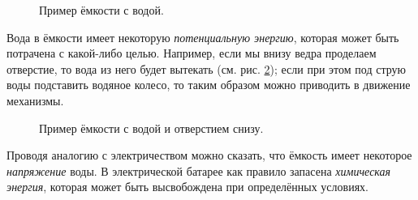\documentclass[a4paper,twoside]{book}
\begin{document}
\begin{figure}[ht]
  \centering
  \caption{Пример ёмкости с водой.}
  \label{fig:electronics-current-0}
\end{figure}

Вода в ёмкости имеет некоторую \emph{потенциальную энергию}, которая может быть
потрачена с какой-либо целью.  Например, если мы внизу ведра проделаем
отверстие, то вода из него будет вытекать
(см. рис. \ref{fig:electronics-current-1}); если при этом под струю воды
подставить водяное колесо, то таким образом можно приводить в движение
механизмы.

\begin{figure}[ht]
  \centering
  \caption{Пример ёмкости с водой и отверстием снизу.}
  \label{fig:electronics-current-1}
\end{figure}

Проводя аналогию с электричеством можно сказать, что ёмкость имеет некоторое
\emph{напряжение} воды.  В электрической батарее как правило запасена
\emph{химическая энергия}, которая может быть высвобождена при определённых
условиях.
\end{document}
